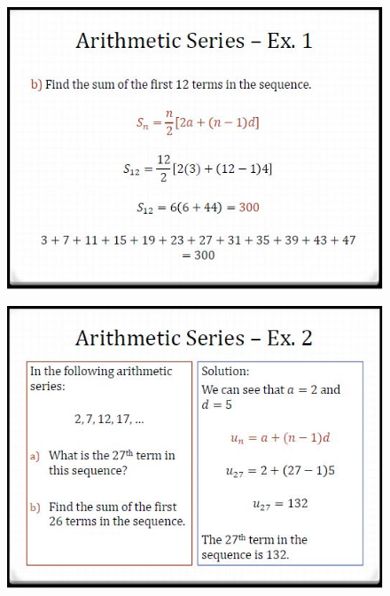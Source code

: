 \documentclass{beamer}
\begin{document}
\begin{frame}
	\begin{figure}
		\centering
		\includegraphics[width=0.99\linewidth]{SeqSer17E}
	\end{figure}
	
\end{frame}	
\begin{frame}
	\begin{figure}
		\centering
		\includegraphics[width=0.99\linewidth]{SeqSer17F}
	\end{figure}
	
\end{frame}
\end{document}
